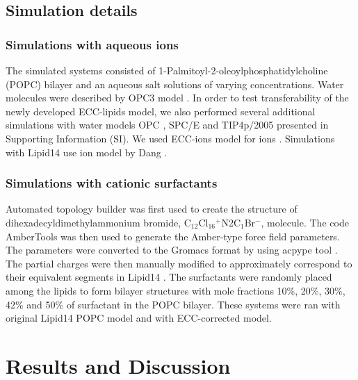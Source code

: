 \documentclass[aip,jcp,twocolumn]{revtex4}
\begin{document}
\subsection{Simulation details}

\subsubsection{Simulations with aqueous ions}
The simulated systems consisted of 1-Palmitoyl-2-oleoylphosphatidylcholine
(POPC) bilayer and an aqueous salt solutions of varying concentrations.
Water molecules were described by OPC3 model \cite{Izadi16}.
In order to test transferability of the newly developed ECC-lipids model, 
we also performed several additional simulations with water models 
OPC \cite{Izadi14}, SPC/E \cite{Berendsen1987} and TIP4p/2005 \cite{Abascal2005}
presented in Supporting Information (SI). 
We used ECC-ions model for ions \cite{jungwirth17-new-paper-to-be-published, kohagen16, Pluharova2014}.  %
Simulations with Lipid14 use ion model by Dang \cite{smith94,chang1999,dang2006}. 

\subsubsection{Simulations with cationic surfactants}
Automated topology builder \cite{malde11} was first used to create the structure of
dihexadecyldimethylammonium bromide, C$_{12}$Cl$_{16}$$^+$N2C$_1$Br$^-$, molecule.
The code AmberTools \cite{amber} was then used to generate the Amber-type force field
parameters. The parameters were converted to the Gromacs format by using
acpype tool \cite{acpype}. The partial charges were then manually modified
to approximately correspond to their equivalent segments in Lipid14 \cite{dickson14}.
The surfactants were randomly placed among the lipids to form bilayer structures with
mole fractions 10\%, 20\%, 30\%, 42\% and 50\% of surfactant in the POPC bilayer.
These systems were ran with original Lipid14 POPC model and with ECC-corrected model.

\section{Results and Discussion}
\end{document}

